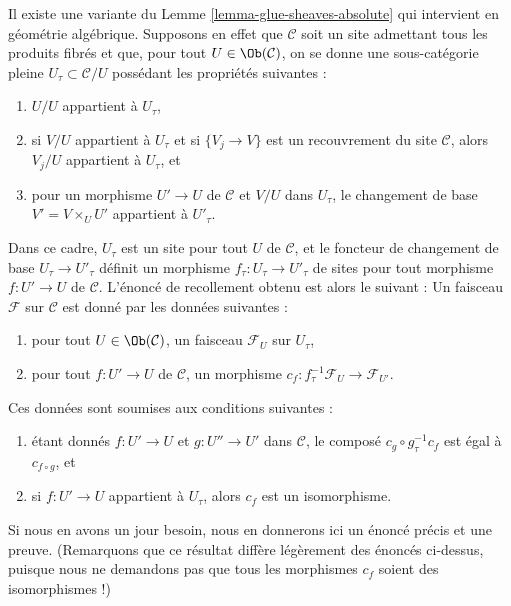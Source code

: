 \begin{remark}
\label{remark-variant-glue-sheaves-absolute}
Il existe une variante du Lemme \ref{lemma-glue-sheaves-absolute}
qui intervient en géométrie algébrique. Supposons en effet que $\mathcal{C}$
soit un site admettant tous les produits fibrés et que, pour tout $U \in \Ob(\mathcal{C})$,
on se donne une sous-catégorie pleine $U_\tau \subset \mathcal{C}/U$ possédant
les propriétés suivantes :
\begin{enumerate}
\item $U/U$ appartient à $U_\tau$,
\item si $V/U$ appartient à $U_\tau$ et si $\{V_j \to V\}$ est un recouvrement
du site $\mathcal{C}$, alors $V_j/U$ appartient à $U_\tau$, et
\item pour un morphisme $U' \to U$ de $\mathcal{C}$ et $V/U$ dans $U_\tau$,
le changement de base $V' = V \times_U U'$ appartient à $U'_\tau$.
\end{enumerate}
Dans ce cadre, $U_\tau$ est un site pour tout $U$ de $\mathcal{C}$,
et le foncteur de changement de base $U_\tau \to U'_\tau$ définit un morphisme
$f_\tau : U_\tau \to U'_\tau$ de sites pour tout morphisme $f : U' \to U$
de $\mathcal{C}$. L’énoncé de recollement obtenu est alors le suivant :
Un faisceau $\mathcal{F}$ sur $\mathcal{C}$ est donné par les données suivantes :
\begin{enumerate}
\item pour tout $U \in \Ob(\mathcal{C})$, un faisceau
$\mathcal{F}_U$ sur $U_\tau$,
\item pour tout $f : U' \to U$ de $\mathcal{C}$, un morphisme
$c_f : f_\tau^{-1}\mathcal{F}_U \to \mathcal{F}_{U'}$.
\end{enumerate}
Ces données sont soumises aux conditions suivantes :
\begin{enumerate}
\item[(a)] étant donnés $f : U' \to U$ et $g : U'' \to U'$ dans
$\mathcal{C}$, le composé
$c_g \circ g_\tau^{-1}c_f$ est égal à $c_{f \circ g}$, et
\item[(b)] si $f : U' \to U$ appartient à $U_\tau$, alors $c_f$ est un isomorphisme.
\end{enumerate}
Si nous en avons un jour besoin, nous en donnerons ici un énoncé précis et une preuve.
(Remarquons que ce résultat diffère légèrement des énoncés
ci-dessus, puisque nous ne demandons pas que tous les morphismes $c_f$ soient des isomorphismes !)
\end{remark}



